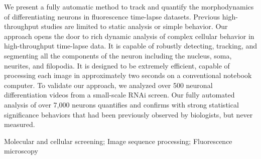
We present a fully automatic method  to track and quantify the morphodynamics of
differentiating neurons  in fluorescence  time-lapse datasets.  Previous high-throughput studies are
limited to static analysis or simple behavior. Our approach opens the door to rich 
dynamic analysis of complex cellular behavior in high-throughput time-lapse data.
It is
capable of  robustly detecting, tracking,  and segmenting all the  components of
the neuron including the nucleus, soma, neurites, and filopodia.  It is designed
to be extremely efficient, capable of processing each image in approximately two
seconds  on a  conventional notebook  computer.   To validate  our approach,  we
analyzed over 500 neuronal differentiation videos from a small-scale RNAi screen. Our
fully automated analysis of over 7,000 neurons quantifies  and  confirms with strong
statistical significance behaviors that  had  been previously observed by 
biologists, but  never measured. 




\begin{keywords}
Molecular and cellular screening; Image sequence processing; Fluorescence microscopy
\end{keywords}

